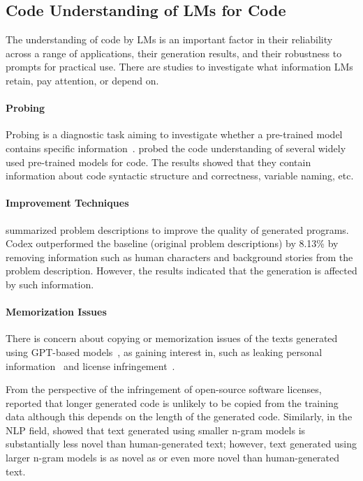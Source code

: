 \documentclass{article}
\begin{document}
\subsection{Code Understanding of LMs for Code}
\label{sec:related-work:understanding}

The understanding of code by LMs is an important factor in their reliability across a range of applications, their generation results, and their robustness to prompts for practical use.
There are studies to investigate what information LMs retain, pay attention, or depend on.



\paragraph{Probing}

Probing is a diagnostic task aiming to investigate whether a pre-trained model contains specific information~\citep{karmakar2021knowledge}.
\citet{troshin2022probing} probed the code understanding of several widely used pre-trained models for code.
The results showed that they contain information about code syntactic structure and correctness, variable naming, etc.



\paragraph{Improvement Techniques}

\citet{kuznia2022lessismore} summarized problem descriptions to improve the quality of generated programs.
Codex outperformed the baseline (original problem descriptions) by 8.13\% by removing information such as human characters and background stories from the problem description.
However, the results indicated that the generation is affected by such information.



\paragraph{Memorization Issues}

There is concern about copying or memorization issues of the texts generated using GPT-based models~\citep{carlini2021extract,elangovan2021memorization}, as gaining interest in, such as leaking personal information~\citep{huang2022leaking} and license infringement~\citep{ciniselli2022copy}.

From the perspective of the infringement of open-source software licenses, \citet{ciniselli2022copy} reported that longer generated code is unlikely to be copied from the training data although this depends on the length of the generated code.
Similarly, in the NLP field, \citet{mccoy2021copy} showed that text generated using smaller n-gram models is substantially less novel than human-generated text; however, text generated using larger n-gram models is as novel as or even more novel than human-generated text.
\end{document}
